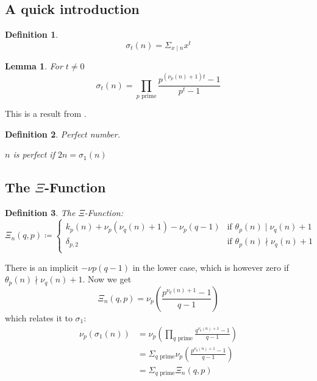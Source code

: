 \documentclass{article}
\newenvironment{pg}{

}{

\medskip

}
\newtheorem{definition}{Definition}
\newtheorem{lemma}{Lemma}[section]
\begin{document}
	\subsection{A quick introduction}
	
	\begin{pg}
		\begin{definition}
			\begin{equation*}
				σ_t(n) = Σ_{x \mid n} x^t
			\end{equation*}
		\end{definition}
		
		\begin{lemma} For $t≠0$
			\begin{equation*}
				σ_t(n) = \prod_{p \text{ prime}} \frac{p^{(ν_p(n) + 1)t} - 1}{p^t - 1}
			\end{equation*}
		\end{lemma}
		This is a result from \cite{hardy2008}.
	\end{pg}
	
	\begin{pg}
		\begin{definition} Perfect number.
			\begin{center}
				$n$ is perfect if $2n = σ_1(n)$
			\end{center}
		\end{definition}
	\end{pg}
	
	\subsection{The \texorpdfstring{$Ξ$}{Ξ}-Function}
	
	\begin{definition} The $Ξ$-Function:
		\begin{equation*}
			Ξ_n(q,p) \coloneq 
			\begin{cases}
				k_p(n) + ν_p(ν_q(n) + 1) - ν_p(q-1) & \text{if } θ_p(n) \mid ν_q(n) + 1 \\
				δ_{p,2} & \text{if } θ_p(n) \nmid ν_q(n) + 1 \\
			\end{cases}
		\end{equation*}
	\end{definition}
	There is an implicit $-νp(q-1)$ in the lower case, which is however zero if $θ_p(n) \nmid ν_q(n) + 1$.
	Now we get
	\begin{equation*}
		Ξ_n(q,p) = ν_p\left( \frac{p^{ν_q(n)+1}-1}{q-1} \right)
	\end{equation*}
	which relates it to $σ_1$:
	\begin{equation*}
		\begin{split}
			ν_p(σ_1(n)) &= ν_p\left(  \prod_{q \text{ prime}} \frac{q^{ν_q(n)+1}-1}{q-1} \right) \\
			&= Σ_{q \text{ prime}} ν_p\left( \frac{p^{ν_q(n)+1}-1}{q-1} \right) \\
			&= Σ_{q \text{ prime}} Ξ_n(q,p)
		\end{split}
	\end{equation*}
	
\end{document}
